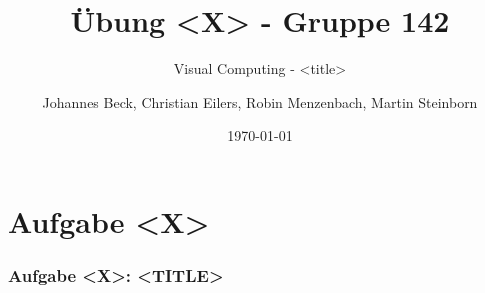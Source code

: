\documentclass[accentcolor=tud9c,colorbacktitle,inverttitle,landscape,german,presentation,t]{tudbeamer}
\begin{document}
\title{\"Ubung <X> - Gruppe 142}%
\subtitle{Visual Computing - <title>}%


\author[Johannes Beck, Christian Eilers, Robin Menzenbach, Martin Steinborn]{Johannes Beck, Christian Eilers, Robin Menzenbach, Martin Steinborn}


\date{\today}

\begin{titleframe}
\end{titleframe}

\section{Aufgabe <X>} %
	\begin{frame}
		\frametitle{Aufgabe <X>: <TITLE>}%
	\end{frame}
\end{document}
